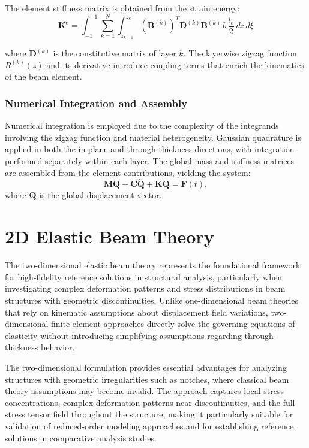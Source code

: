 \documentclass[12pt,a4paper]{report}
\begin{document}
The element stiffness matrix is obtained from the strain energy:
\begin{equation}
    \mathbf{K}^e = \int_{-1}^{+1} \sum_{k=1}^{N} \int_{z_{k-1}}^{z_k} 
(\mathbf{B}^{(k)})^T \mathbf{D}^{(k)} \mathbf{B}^{(k)} \, b \, \frac{l_e}{2} \, dz \, d\xi
\end{equation}

where $\mathbf{D}^{(k)}$ is the constitutive matrix of layer $k$. The layerwise zigzag function $R^{(k)}(z)$ and its derivative introduce coupling terms that enrich the kinematics of the beam element.

\subsubsection*{Numerical Integration and Assembly}

Numerical integration is employed due to the complexity of the integrands involving the zigzag function and material heterogeneity. Gaussian quadrature is applied in both the in-plane and through-thickness directions, with integration performed separately within each layer. The global mass and stiffness matrices are assembled from the element contributions, yielding the system:
\begin{equation}
\mathbf{M} \ddot{\mathbf{Q}} + \mathbf{C} \dot{\mathbf{Q}} + \mathbf{K} \mathbf{Q} = \mathbf{F}(t),
\end{equation}
where $\mathbf{Q}$ is the global displacement vector.


\section{2D Elastic Beam Theory}
\label{sec:2d_elastic_theory}

The two-dimensional elastic beam theory represents the foundational framework for high-fidelity reference solutions in structural analysis, particularly when investigating complex deformation patterns and stress distributions in beam structures with geometric discontinuities. Unlike one-dimensional beam theories that rely on kinematic assumptions about displacement field variations, two-dimensional finite element approaches directly solve the governing equations of elasticity without introducing simplifying assumptions regarding through-thickness behavior.

The two-dimensional formulation provides essential advantages for analyzing structures with geometric irregularities such as notches, where classical beam theory assumptions may become invalid. The approach captures local stress concentrations, complex deformation patterns near discontinuities, and the full stress tensor field throughout the structure, making it particularly suitable for validation of reduced-order modeling approaches and for establishing reference solutions in comparative analysis studies.
\end{document}

